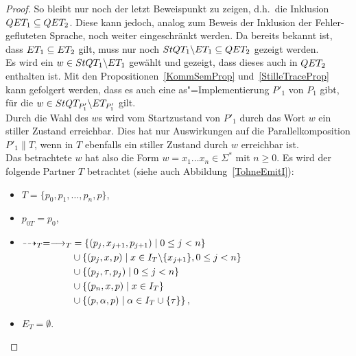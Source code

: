 \begin{proof}
  So bleibt nur noch der letzt Beweispunkt zu zeigen, d.h.\ die Inklusion $QET
  _1\subseteq QET _2$. Diese kann jedoch, analog zum Beweis der Inklusion der
  Fehler-gefluteten Sprache, noch weiter eingeschränkt werden. Da bereits
  bekannt ist, dass $ET _1\subseteq ET _2$ gilt, muss nur noch $StQT
  _1\backslash ET _1\subseteq QET _2$ gezeigt werden.\\
  Es wird ein $w\in StQT _1\backslash ET _1$ gewählt und gezeigt, dass dieses
  auch in $QET _2$ enthalten ist. Mit den Propositionen~\ref{KommSemProp}
  und~\ref{StilleTraceProp} kann gefolgert werden, dass es auch eine
  as"=Implementierung $P'_1$ von $P_1$ gibt, für die $w\in StQT _{P'_1}
  \backslash ET _{P'_1}$ gilt.\\
  Durch die Wahl des $w$s wird vom Startzustand von $P'_1$ durch das Wort $w$
  ein stiller Zustand erreichbar. Dies hat nur Auswirkungen auf die
  Parallelkomposition $P'_1\|T$, wenn in $T$ ebenfalls ein stiller Zustand
  durch $w$ erreichbar ist.\\
  Das betrachtete $w$ hat also die Form $w=x_1\dots x_n\in\Sigma ^*$ mit $n\geq
  0$. Es wird der folgende Partner $T$ betrachtet (siehe auch
  Abbildung~\ref{TohneEmitI}):
  \begin{itemize}
    \item $T=\{p_0,p_1,\dots ,p_n, p\}$,
    \item $p_{0T}=p_0$,
    \item $\begin{aligned}[t]
        \may _T = \must _T&=\left\{(p_j,x_{j+1},p_{j+1})\mid  0\leq j<
        n\right\}\\
        &\cup\left\{(p_j,x,p)\mid  x\in I_T\backslash\{x_{j+1}\}, 0\leq j<
        n\right\}\\
        &\cup\left\{(p_j,\tau,p_j)\mid 0\leq j< n\right\}\\
        &\cup\left\{(p_n,x,p)\mid x\in I_T\right\}\\
        &\cup\left\{(p,\alpha,p)\mid \alpha\in I_T\cup\{\tau\}\right\},
    \end{aligned}$
    \item $E_T=\emptyset$.
  \end{itemize}
  \begin{figure} [h!tbp]
  \begin{center}
\end{center}
\end{figure}
\end{proof}
